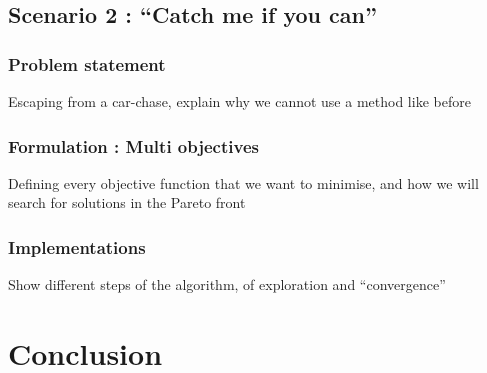 \documentclass[11pt, oneside]{article}   	%
\begin{document}
	\subsection{Scenario 2 : ``Catch me if you can''}
		\subsubsection{Problem statement}
			Escaping from a car-chase, explain why we cannot use a method like before
		\subsubsection{Formulation : Multi objectives}
			Defining every objective function that we want to minimise, and how we will search for solutions in the Pareto front
		\subsubsection{Implementations}
			Show different steps of the algorithm, of exploration and ``convergence''
\section*{Conclusion}
			
\end{document}
